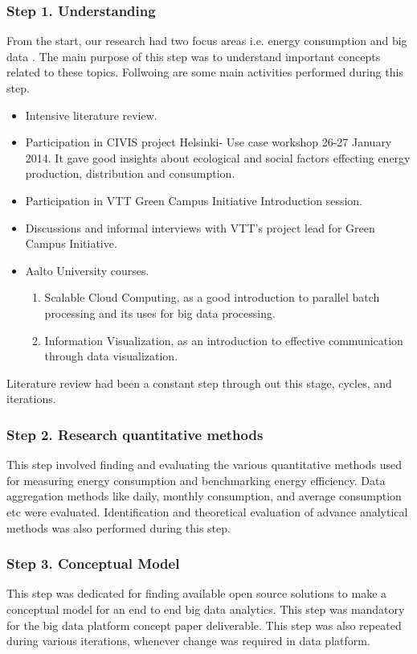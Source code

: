 \subsubsection{Step 1. Understanding} 
From the start, our research had two focus areas i.e. energy consumption and big data . The main purpose of this step was to understand important concepts related to these topics. Follwoing are some main activities performed during this step.
\begin{itemize}
\item Intensive literature review.
\item Participation in CIVIS project Helsinki- Use case workshop 26-27 January 2014. It gave good insights about ecological and social factors effecting energy production, distribution and consumption.
\item Participation in VTT Green Campus Initiative Introduction session.
\item Discussions and informal interviews with VTT's project lead for Green Campus Initiative.
\item Aalto University courses.
	\begin{enumerate}
	    \item Scalable Cloud Computing, as a good introduction to parallel batch processing and its uses for big data processing.
	    \item Information Visualization, as an introduction to effective communication through data visualization.
	  \end{enumerate}      
\end{itemize}

Literature review had been a constant step through out this stage, cycles, and iterations.
\subsubsection{Step 2. Research quantitative methods} 
This step involved finding and evaluating the various quantitative methods used for measuring energy consumption and benchmarking energy efficiency. Data aggregation methods like daily, monthly consumption, and average consumption etc were evaluated. Identification and theoretical evaluation of advance analytical methods was also performed during this step.
\subsubsection{Step 3. Conceptual Model}\label{cmodel}
This step was dedicated for finding available open source solutions to make a conceptual model for an end to end big data analytics. This step was mandatory for the big data platform concept paper deliverable. This step was also repeated during various iterations, whenever change was required in data platform.
